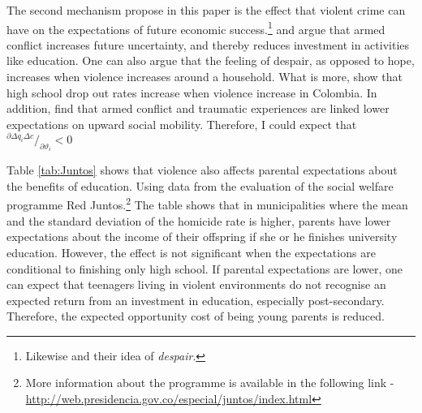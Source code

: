 \documentclass[a4paper,10pt,twocolumn,preprint,3p,authoryear]{elsarticle}
\newcommand*\rfrac[2]{{}^{#1}\!/_{#2}}
\begin{document}
The second mechanism propose in this paper is the effect that violent crime can have on the expectations of future economic success.\footnote{Likewise \citet{KearneyLevine2011} and their idea of \emph{despair}.} \citet{Soares2005,Soares2013} and \citet{LorentzenEtAl2008} argue that armed conflict increases future uncertainty, and thereby reduces investment in activities like education. One can also argue that the feeling of despair, as opposed to hope, increases when violence increases around a household. What is more, \citet{RodriguezSanchez2009} show that high school drop out rates increase when violence increase in Colombia. In addition, \citet{MoyaCarter2014} find that armed conflict and traumatic experiences are linked lower expectations on upward social mobility. Therefore, I could expect that $\rfrac{\partial\Delta q_{i}\Delta c}{\partial \vartheta_{i}}<0$

Table \ref{tab:Juntos} shows that violence also affects parental expectations about the benefits of education. Using data from the evaluation of the social welfare programme Red Juntos.\footnote{More information about the programme is available in the following link - \href{Red Juntos}{http://web.presidencia.gov.co/especial/juntos/index.html}} The table shows that in municipalities where the mean and the standard deviation of the homicide rate is higher, parents have lower expectations about the income of their offspring if she or he finishes university education. However, the effect is not significant when the expectations are conditional to finishing only high school. If parental expectations are lower, one can expect that teenagers living in violent environments do not recognise an expected return from an investment in education, especially post-secondary. Therefore, the expected opportunity cost of being young parents is reduced. 
\end{document}
